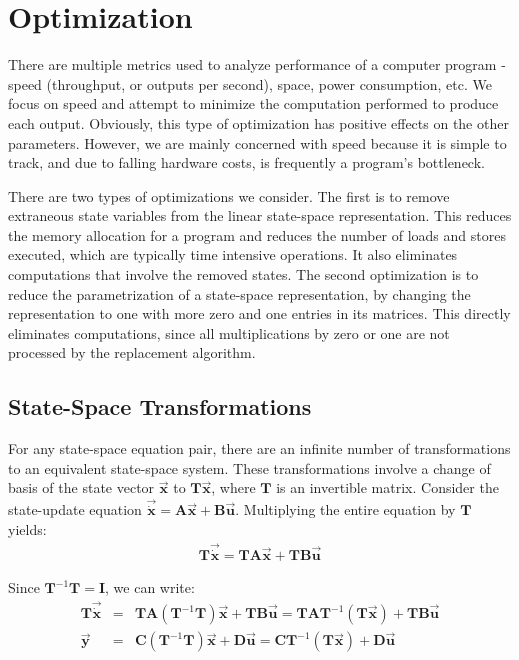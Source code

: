 \chapter{Optimization}

     There are multiple metrics used to analyze performance
of a computer program - speed (throughput, or outputs per second),
space, power consumption, etc. We focus on speed and attempt to
minimize the computation performed to produce each output.
Obviously, this type of optimization has positive effects on the
other parameters. However, we are mainly concerned with speed
because it is simple to track, and due to falling hardware costs,
is frequently a program's bottleneck.

    There are two types of optimizations we consider.  The first is to
remove extraneous state variables from the linear state-space
representation. This reduces the memory allocation for a program
and reduces the number of loads and stores executed, which are
typically time intensive operations. It also eliminates
computations that involve the removed states.  The second
optimization is to reduce the parametrization of a state-space
representation, by changing the representation to one with more
zero and one entries in its matrices. This directly eliminates
computations, since all multiplications by zero or one are not
processed by the replacement algorithm.

\section{State-Space Transformations}

    For any state-space equation pair, there are an infinite
number of transformations to an equivalent state-space system.
These transformations involve a change of basis of the state
vector $\vec{\mathbf{x}}$ to $\mathbf{T} \vec{\mathbf{x}}$, where
$\mathbf{T}$ is an invertible matrix. Consider the state-update
equation $\vec{\dot{\mathbf{x}}} = \mathbf{A} \vec{\mathbf{x}} +
\mathbf{B} \vec{\mathbf{u}}$. Multiplying the entire equation by
$\mathbf{T}$ yields:
\begin{eqnarray*}
\mathbf{T} \vec{\dot{\mathbf{x}}} = \mathbf{TA} \vec{\mathbf{x}} +
\mathbf{TB} \vec{\mathbf{u}}
\end{eqnarray*}

    Since $\mathbf{T}^{-1} \mathbf{T} = \mathbf{I}$, we can write:
\begin{eqnarray*}
\mathbf{T} \vec{\dot{\mathbf{x}}} & = & \mathbf{TA}
(\mathbf{T}^{-1} \mathbf{T}) \vec{\mathbf{x}} + \mathbf{TB}
\vec{\mathbf{u}} = \mathbf{TA}
\mathbf{T}^{-1} (\mathbf{T} \vec{\mathbf{x}}) + \mathbf{TB} \vec{\mathbf{u}} \\
\vec{\mathbf{y}} & = & \mathbf{C} (\mathbf{T}^{-1} \mathbf{T})
\vec{\mathbf{x}} + \mathbf{D} \vec{\mathbf{u}} = \mathbf{C}
\mathbf{T}^{-1} (\mathbf{T} \vec{\mathbf{x}}) + \mathbf{D}
\vec{\mathbf{u}}
\end{eqnarray*}

